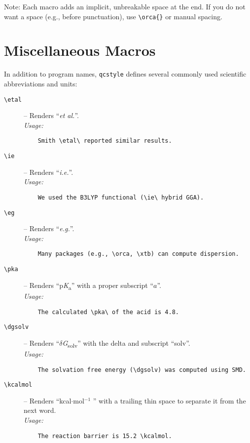 \documentclass[a4paper,12pt]{article}
\begin{document}
\noindent Note: Each macro adds an implicit, unbreakable space at the end. If you do not want a space (e.g., before punctuation), use \verb|\orca{}| or manual spacing.

\section{Miscellaneous Macros}
\label{sec:misc}
In addition to program names, \texttt{qcstyle} defines several commonly used scientific abbreviations and units:

\begin{description}
    \item[\texttt{\textbackslash etal}]  – Renders “\textit{et al.}”. \\
    \textit{Usage:} 
    \begin{verbatim}
    Smith \etal\ reported similar results.
    \end{verbatim}

    \item[\texttt{\textbackslash ie}]    – Renders “\textit{i.e.}”. \\
    \textit{Usage:} 
    \begin{verbatim}
    We used the B3LYP functional (\ie\ hybrid GGA).
    \end{verbatim}

    \item[\texttt{\textbackslash eg}]   – Renders “\textit{e.g.}”. \\
    \textit{Usage:} 
    \begin{verbatim}
    Many packages (e.g., \orca, \xtb) can compute dispersion.
    \end{verbatim}

    \item[\texttt{\textbackslash pka}]   – Renders “p\textit{K}\textsubscript{a}” with a proper subscript “$a$”. \\
    \textit{Usage:} 
    \begin{verbatim}
    The calculated \pka\ of the acid is 4.8.
    \end{verbatim}

    \item[\texttt{\textbackslash dgsolv}] – Renders “$\delta$\textit{G}\textsubscript{solv}” with the delta and subscript “solv”. \\
    \textit{Usage:} 
    \begin{verbatim}
    The solvation free energy (\dgsolv) was computed using SMD.
    \end{verbatim}

    \item[\texttt{\textbackslash kcalmol}] – Renders “kcal$\cdot$mol$^{-1}$ ” with a trailing thin space to separate it from the next word. \\
    \textit{Usage:} 
    \begin{verbatim}
    The reaction barrier is 15.2 \kcalmol.
    \end{verbatim}
\end{description}
\end{document}

